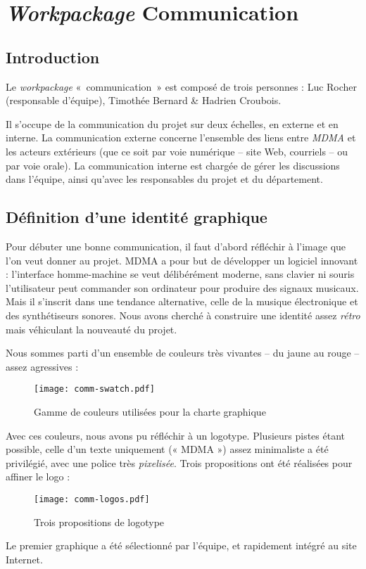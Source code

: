 \section{\emph{Workpackage} Communication}
\subsection{Introduction}
\par Le \emph{workpackage} «~communication~» est composé de trois personnes : Luc Rocher (responsable d'équipe), Timothée Bernard \& Hadrien Croubois.
\par Il s'occupe de la communication du projet sur deux échelles, en externe et en interne. La communication externe concerne l'ensemble des liens entre \emph{MDMA} et les acteurs extérieurs (que ce soit par voie numérique -- site Web, courriels -- ou par voie orale). La communication interne est chargée de gérer les discussions dans l'équipe, ainsi qu'avec les responsables du projet et du département.
\subsection{Définition d'une identité graphique}
\par Pour débuter une bonne communication, il faut d'abord réfléchir à l'image que l'on veut donner au projet. MDMA a pour but de développer un logiciel innovant : l'interface homme-machine se veut délibérément moderne, sans clavier ni souris l'utilisateur peut commander son ordinateur pour produire des signaux musicaux. Mais il s'inscrit dans une tendance alternative, celle de la musique électronique et des synthétiseurs sonores. Nous avons cherché à construire une identité assez \emph{rétro} mais véhiculant la nouveauté du projet.
\par Nous sommes parti d'un ensemble de couleurs très vivantes -- du jaune au rouge -- assez agressives :
\begin{figure}[H]
  \centering
  \texttt{[image: comm-swatch.pdf]}
  \caption{Gamme de couleurs utilisées pour la charte graphique}
  \label{fig:swatch}
\end{figure}
\par Avec ces couleurs, nous avons pu réfléchir à un logotype. Plusieurs pistes étant possible, celle d'un texte uniquement (« MDMA ») assez minimaliste a été privilégié, avec une police très \emph{pixelisée}. Trois propositions ont été réalisées pour affiner le logo :
\begin{figure}[H]
  \centering
    \texttt{[image: comm-logos.pdf]}
  \caption{Trois propositions de logotype}
  \label{fig:Logos-MDMA}
\end{figure}
\par Le premier graphique a été sélectionné par l'équipe, et rapidement intégré au site Internet.

